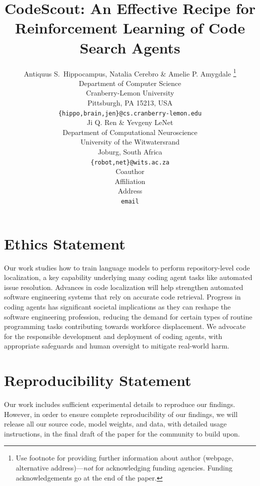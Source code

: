 \documentclass{article} %
\title{CodeScout: An Effective Recipe for Reinforcement Learning of Code Search Agents}
\author{Antiquus S.~Hippocampus, Natalia Cerebro \& Amelie P. Amygdale \thanks{ Use footnote for providing further information
about author (webpage, alternative address)---\emph{not} for acknowledging
funding agencies.  Funding acknowledgements go at the end of the paper.} \\
Department of Computer Science\\
Cranberry-Lemon University\\
Pittsburgh, PA 15213, USA \\
\texttt{\{hippo,brain,jen\}@cs.cranberry-lemon.edu} \\
\And
Ji Q. Ren \& Yevgeny LeNet \\
Department of Computational Neuroscience \\
University of the Witwatersrand \\
Joburg, South Africa \\
\texttt{\{robot,net\}@wits.ac.za} \\
\AND
Coauthor \\
Affiliation \\
Address \\
\texttt{email}
}
\begin{document}
\ifcolmsubmission
\linenumbers
\fi

\maketitle












\newpage
\section*{Ethics Statement}

Our work studies how to train language models to perform repository-level code localization, a key capability underlying many coding agent tasks like automated issue resolution. Advances in code localization will help strengthen automated software engineering systems that rely on accurate code retrieval. Progress in coding agents has significant societal implications as they can reshape the software engineering profession, reducing the demand for certain types of routine programming tasks contributing towards workforce displacement. We advocate for the responsible development and deployment of coding agents, with appropriate safeguards and human oversight to mitigate real-world harm.

\section*{Reproducibility Statement}
Our work includes sufficient experimental details to reproduce our findings. However, in order to ensure complete reproducibility of our findings, we will release all our source code, model weights, and data, with detailed usage instructions, in the final draft of the paper for the community to build upon.





\appendix
\end{document}
